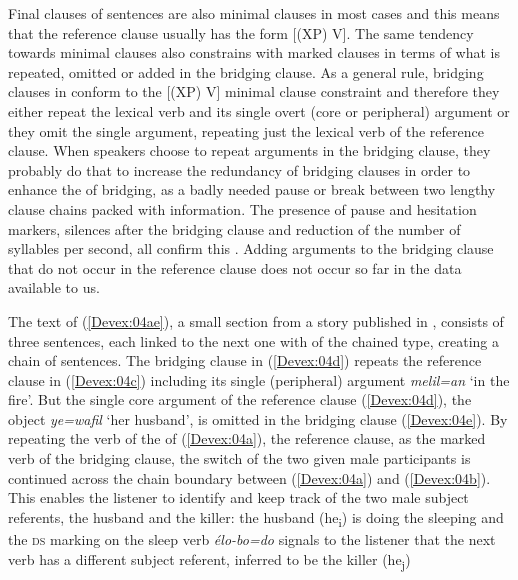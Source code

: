 \documentclass[output=paper]{LSP/langsci}
\begin{document}
Final clauses of sentences are also minimal clauses in most cases and this means that the reference clause usually has the form [(XP) V]. The same tendency towards minimal clauses also constrains  with  marked clauses in terms of what is repeated, omitted or added in the bridging clause. As a general rule, bridging clauses in  conform to the [(XP) V] minimal clause constraint and therefore they either repeat the lexical verb and its single overt (core or peripheral) argument or they omit the single argument, repeating just the lexical verb of the reference clause. When speakers choose to repeat arguments in the bridging clause, they probably do that to increase the redundancy of bridging clauses in order  to enhance the  of bridging, as a badly needed pause or break between two lengthy clause chains packed with information. The presence of pause and hesitation markers, silences after the bridging clause and reduction of the number of syllables per second, all confirm this . Adding arguments to the bridging clause that do not occur in the reference clause does not occur so far in the data available to us.


The text of (\ref{Devex:04ae}), a small section from a story published in \cite{enk97}, consists of three sentences, each linked to the next one with  of the chained type, creating a chain of sentences. The bridging clause in (\ref{Devex:04d}) repeats the reference clause in (\ref{Devex:04c}) including its single (peripheral) argument \textit{melil=an} `in the fire'. But the single core argument of the reference clause (\ref{Devex:04d}), the object \textit{ye=wafil} `her husband', is omitted in the bridging clause (\ref{Devex:04e}). By repeating the verb of the  of (\ref{Devex:04a}), the reference clause, as the  marked verb of the bridging clause, the switch  of the two given male participants is continued across the chain boundary between (\ref{Devex:04a}) and (\ref{Devex:04b}). This enables the  listener to identify and keep track of the two male subject referents, the husband and the killer: the husband (he\textsubscript{i}) is doing the sleeping and the \textsc{ds} marking on the sleep verb \textit{élo-bo=do} signals to the listener that the next verb has a different subject referent, inferred to be the killer (he\textsubscript{j})     
\end{document}
